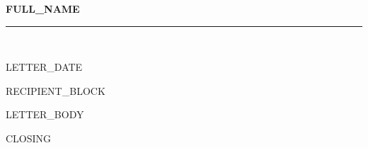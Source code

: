 \documentclass[11pt,letterpaper]{article}
\begin{document}
\begin{center}
{\fontsize{22}{26}\selectfont\bfseries\color{headercolor} {{FULL_NAME}}}\\[0.35em]
{\fontsize{11}{13}}
\end{center}
\color{black}\rule{\linewidth}{0.5pt} \\[0.35ex]

\setlength{\parindent}{0pt}
\vspace{0.6em}

{\fontsize{11}{13}\selectfont
{{LETTER_DATE}}
}

\vspace{0.6em}

{\fontsize{11}{13}\selectfont
{{RECIPIENT_BLOCK}}
}

\vspace{0.6em}

{\fontsize{11}{13}\selectfont
{{LETTER_BODY}}
}

\vspace{0.6em}

{\fontsize{11}{13}\selectfont
{{CLOSING}}
}

\vspace{1.2em}

{\fontsize{12}{14}}
\end{document}

